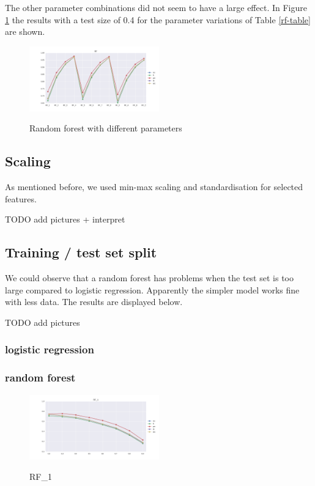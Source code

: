 \documentclass{sig-alternate-05-2015}
\begin{document}
The other parameter combinations did not seem to have a large effect.
In Figure \ref{fig:rf} the results with a test size of 0.4 for the parameter variations of Table \ref{rf-table} are shown.

\begin{figure}[h]
  \centering
  \caption{Random forest with different parameters}
  \includegraphics[width=0.5\textwidth]{../plots/RF_compare_param}
  \label{fig:rf}
\end{figure}

\subsection{Scaling}

As mentioned before, we used min-max scaling and standardisation for selected features.

TODO add pictures + interpret

\subsection{Training / test set split}

We could observe that a random forest has problems when the test set is too large compared to logistic regression. Apparently the simpler model works fine with less data.
The results are displayed below.

TODO add pictures

\subsubsection{logistic regression}

\subsubsection{random forest}

\begin{figure}[]
  \centering
  \caption{RF\_1}
  \includegraphics[width=0.5\textwidth]{../plots/RF_1}
  \label{fig:rf1}
\end{figure}
\end{document}
